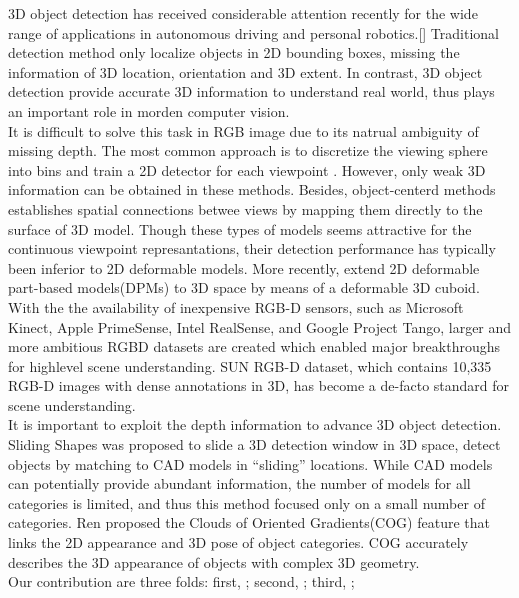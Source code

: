 \documentclass[english]{ccdconf}
\begin{document}
3D object detection has received considerable attention recently for the wide range of applications in autonomous driving and personal robotics.[] Traditional detection method only localize objects in 2D bounding boxes, missing the information of 3D location, orientation and 3D extent. In contrast, 3D object detection provide accurate 3D information to understand real world, thus plays an important role in morden computer vision.\\
It is difficult to solve this task in RGB image due to its natrual ambiguity of missing depth. The most common approach is to discretize the viewing sphere into bins and train a 2D detector for each viewpoint \cite{gu2010discriminative}. However, only weak 3D information can be obtained in these methods. Besides, object-centerd methods establishes spatial connections betwee views by mapping them directly to the surface of 3D model. Though these types of models seems attractive for the continuous viewpoint represantations, their detection performance has typically been inferior to 2D deformable models. More recently, \cite{fidler20123d} extend 2D deformable part-based models(DPMs)\cite{felzenszwalb2010object} to 3D space by means of a deformable 3D cuboid.\\
With the the availability of inexpensive RGB-D sensors, such as Microsoft Kinect, Apple PrimeSense, Intel RealSense, and Google Project Tango, larger and more ambitious RGBD datasets are created which enabled major breakthroughs for highlevel scene understanding\cite{silberman2012indoor,janoch2013category}. SUN RGB-D dataset\cite{song2015sun}, which contains 10,335 RGB-D images with dense annotations in 3D, has become a de-facto standard for scene understanding.\\
It is important to exploit the depth information to advance 3D object detection. Sliding Shapes\cite{song2014sliding} was proposed to slide a 3D detection window in 3D space, detect objects by matching to CAD models in “sliding” locations. While CAD models can potentially provide abundant information, the number of models for all categories is limited, and thus this method focused only on a small number of categories. Ren\cite{ren2016three} proposed the Clouds of Oriented Gradients(COG) feature that links the 2D appearance and 3D pose of object categories. COG accurately describes the 3D appearance of objects with complex 3D geometry.\\
Our contribution are three folds:
first, ;
second, ; 
third, ;
\end{document}

